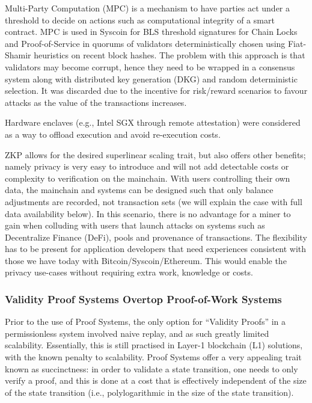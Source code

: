 \documentclass[peerreview]{ieeesyscoin}
\begin{document}
Multi-Party Computation (MPC) is a mechanism to have parties act under a threshold to decide on actions such as computational integrity of a smart contract. MPC is used in Syscoin for BLS threshold signatures for Chain Locks and Proof-of-Service in quorums of validators deterministically chosen using Fiat-Shamir heuristics on recent block hashes. The problem with this approach is that validators may become corrupt, hence they need to be wrapped in a consensus system along with distributed key generation (DKG) and random deterministic selection. It was discarded due to the incentive for risk/reward scenarios to favour attacks as the value of the transactions increases.

Hardware enclaves (e.g., Intel SGX through remote attestation) were considered as a way to offload execution and avoid re-execution costs. 

ZKP allows for the desired superlinear scaling trait, but also offers other benefits; namely privacy is very easy to introduce and will not add detectable costs or complexity to verification on the mainchain. With users controlling their own data, the mainchain and systems can be designed such that only balance adjustments are recorded, not transaction sets (we will explain the case with full data availability below). In this scenario, there is no advantage for a miner to gain when colluding with users that launch attacks on systems such as Decentralize Finance (DeFi), pools and provenance of transactions. The flexibility has to be present for application developers that need experiences consistent with those we have today with Bitcoin/Syscoin/Ethereum. This would enable the privacy use-cases without requiring extra work, knowledge or costs.


\subsubsection{Validity Proof Systems Overtop Proof-of-Work Systems}

Prior to the use of Proof Systems, the only option for “Validity Proofs” in a permissionless system involved naive replay, and as such greatly limited scalability. Essentially, this is still practised in Layer-1 blockchain (L1) solutions, with the known penalty to scalability. Proof Systems offer a very appealing trait known as succinctness: in order to validate a state transition, one needs to only verify a proof, and this is done at a cost that is effectively independent of the size of the state transition (i.e., polylogarithmic in the size of the state transition).
\end{document}
